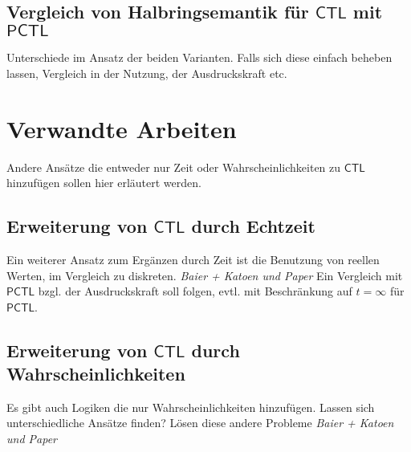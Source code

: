 \documentclass{lni}
\newcommand{\CTL}{\mathsf{CTL}}
\newcommand{\PCTL}{\mathsf{PCTL}}
\begin{document}
\subsection{Vergleich von Halbringsemantik für $\CTL$ mit $\PCTL$}

Unterschiede im Ansatz der beiden Varianten. Falls sich diese einfach beheben lassen, Vergleich in der Nutzung, der Ausdruckskraft etc.

\section{Verwandte Arbeiten}
\label{ChapVerwandt}

Andere Ansätze die entweder nur Zeit oder Wahrscheinlichkeiten zu $\CTL$ hinzufügen sollen hier erläutert werden.

\subsection{Erweiterung von $\CTL$ durch Echtzeit}

Ein weiterer Ansatz zum Ergänzen durch Zeit ist die Benutzung von reellen Werten, im Vergleich zu diskreten. \emph{Baier + Katoen und Paper}
Ein Vergleich mit $\PCTL$ bzgl. der Ausdruckskraft soll folgen, evtl. mit Beschränkung auf $t=\infty$ für $\PCTL$.

\subsection{Erweiterung von $\CTL$ durch Wahrscheinlichkeiten}

Es gibt auch Logiken die nur Wahrscheinlichkeiten hinzufügen. Lassen sich unterschiedliche Ansätze finden? Lösen diese andere Probleme \emph{Baier + Katoen und Paper}


\end{document}
